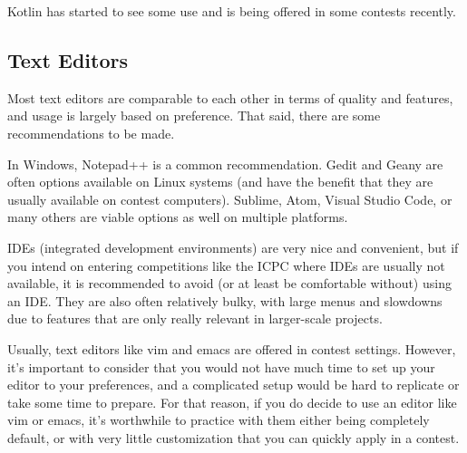 Kotlin has started to see some use and is being offered in some contests recently.

\subsection{Text Editors}

Most text editors are comparable to each other in terms of quality and features, and usage is largely based on preference. That said, there are some recommendations to be made.

In Windows, Notepad++ is a common recommendation. Gedit and Geany are often options available on Linux systems (and have the benefit that they are usually available on contest computers). Sublime, Atom, Visual Studio Code, or many others are viable options as well on multiple platforms.

IDEs (integrated development environments) are very nice and convenient, but if you intend on entering competitions like the ICPC where IDEs are usually not available, it is recommended to avoid (or at least be comfortable without) using an IDE. They are also often relatively bulky, with large menus and slowdowns due to features that are only really relevant in larger-scale projects.

Usually, text editors like vim and emacs are offered in contest settings. However, it's important to consider that you would not have much time to set up your editor to your preferences, and a complicated setup would be hard to replicate or take some time to prepare. For that reason, if you do decide to use an editor like vim or emacs, it's worthwhile to practice with them either being completely default, or with very little customization that you can quickly apply in a contest.